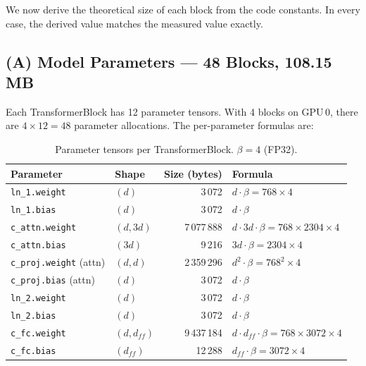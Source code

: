 \documentclass[11pt,a4paper]{article}
\begin{document}
We now derive the theoretical size of each block from the code constants.  In every case, the derived value matches the measured value exactly.

\subsection{(A) Model Parameters --- 48 Blocks, 108.15\,MB}
\label{sec:params}

Each TransformerBlock has 12 parameter tensors.  With 4 blocks on GPU\,0, there are $4 \times 12 = 48$ parameter allocations.  The per-parameter formulas are:

\begin{table}[h]
\centering
\caption{Parameter tensors per TransformerBlock. $\beta=4$ (FP32).}
\label{tab:params}
\begin{tabular}{llrl}
\toprule
\textbf{Parameter} & \textbf{Shape} & \textbf{Size (bytes)} & \textbf{Formula} \\
\midrule
\texttt{ln\_1.weight}     & $(d)$                 & 3\,072       & $d \cdot \beta = 768 \times 4$ \\
\texttt{ln\_1.bias}       & $(d)$                 & 3\,072       & $d \cdot \beta$ \\
\texttt{c\_attn.weight}   & $(d, 3d)$             & 7\,077\,888  & $d \cdot 3d \cdot \beta = 768 \times 2304 \times 4$ \\
\texttt{c\_attn.bias}     & $(3d)$                & 9\,216       & $3d \cdot \beta = 2304 \times 4$ \\
\texttt{c\_proj.weight} \scriptsize{(attn)}   & $(d, d)$   & 2\,359\,296  & $d^{2} \cdot \beta = 768^{2} \times 4$ \\
\texttt{c\_proj.bias} \scriptsize{(attn)}     & $(d)$      & 3\,072       & $d \cdot \beta$ \\
\texttt{ln\_2.weight}     & $(d)$                 & 3\,072       & $d \cdot \beta$ \\
\texttt{ln\_2.bias}       & $(d)$                 & 3\,072       & $d \cdot \beta$ \\
\texttt{c\_fc.weight}     & $(d, d_{ff})$         & 9\,437\,184  & $d \cdot d_{ff} \cdot \beta = 768 \times 3072 \times 4$ \\
\texttt{c\_fc.bias}       & $(d_{ff})$            & 12\,288      & $d_{ff} \cdot \beta = 3072 \times 4$ \\

\end{tabular}
\end{table}
\end{document}
